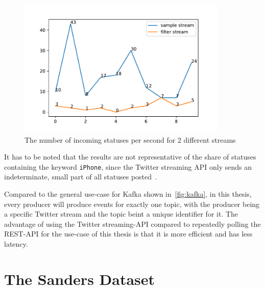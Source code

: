 \begin{figure}
    \centering
    \caption{The number of incoming statuses per second for 2 different streams}
    \label{fig:stream_frequency}
    \includegraphics[width=10cm]{../figures/stream_frequencies.pdf}
\end{figure}

It has to be noted that the results are not representative of the share of statuses containing the keyword \texttt{iPhone},
since the Twitter streaming API only sends an indeterminate, small part of all statuses posted~\cite{twitterDocs}.

\par
Compared to the general use-case for Kafka shown in~\autoref{fig:kafka}, in this thesis,
every producer will produce events for exactly one topic, with the producer being a specific Twitter stream and the topic beint a unique identifier for it.
The advantage of using the Twitter streaming-API compared to repeatedly polling the REST-API for the use-case of this thesis
is that it is more efficient and has less latency.

\section{The Sanders Dataset}
\label{sec:theSandersDataset}

